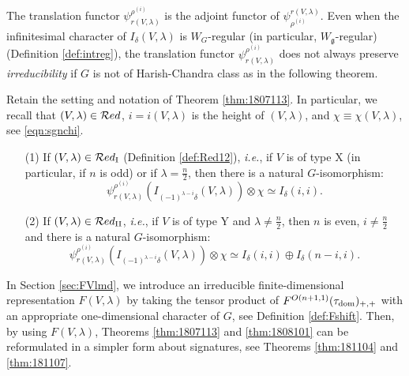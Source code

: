 The translation functor 
 $\psi_{r(V,\lambda)}^{\rho^{(i)}}$
 is the adjoint functor
 of $\psi_{\rho^{(i)}}^{r(V,\lambda)}$.  
Even when the infinitesimal character
 of $I_{\delta}(V,\lambda)$
 is $W_G$-regular
 (in particular,
 $W_{\mathfrak{g}}$-regular)
 (Definition \ref{def:intreg}), 
 the translation functor $\psi_{r(V,\lambda)}^{\rho^{(i)}}$
 does not always preserve {\it{irreducibility}}
 if $G$ is not of Harish-Chandra class as in the following theorem.  

\begin{theorem}
\label{thm:1808101}
Retain the setting and notation of Theorem \ref{thm:1807113}.  
In particular,
 we recall that 
$(V,\lambda)\in {\mathcal{R}}ed$, 
 $i=i(V,\lambda)$ is the height of $(V,\lambda)$, 
 and $\chi\equiv \chi(V,\lambda)$, 
 see \eqref{eqn:sgnchi}.  
\begin{enumerate}
\item[{\rm{(1)}}]
If 
$(V,\lambda)\in {\mathcal{R}}ed_{\operatorname{I}}$
 (Definition \ref{def:Red12}), 
 {\it{i.e.}}, 
 if $V$ is of type X
 (in particular, 
 if $n$ is odd)
 or if $\lambda=\frac n 2$, 
 then there is a natural $G$-isomorphism:
\[
  \psi_{r(V,\lambda)}^{\rho^{(i)}}(I_{(-1)^{\lambda-i}\delta}(V,\lambda))
  \otimes \chi
  \simeq 
  I_{\delta}(i,i).  
\]
\item[{\rm{(2)}}]
If 
$(V,\lambda)\in {\mathcal{R}}ed_{\operatorname{I I}}$, 
 {\it{i.e.}}, 
 if $V$ is of type Y 
 and $\lambda \ne \frac n 2$, 
 then $n$ is even, 
 $i \ne \frac n 2$
 and there is a natural $G$-isomorphism:
\[
  \psi_{r(V,\lambda)}^{\rho^{(i)}}(I_{(-1)^{\lambda-i}\delta}(V,\lambda))
  \otimes \chi
  \simeq 
  I_{\delta}(i,i) \oplus I_{\delta}(n-i,i).  
\]
\end{enumerate}
\end{theorem}
In Section \ref{sec:FVlmd}, 
 we introduce an irreducible finite-dimensional representation
 $F(V,\lambda)$
 by taking the tensor product
 of $F^{{O(n+1,1)}}({\tau_{\operatorname{dom}}})_{+,+}$
 with an appropriate one-dimensional character of $G$, 
 see Definition \ref{def:Fshift}.  
Then, 
 by using $F(V,\lambda)$, 
 Theorems \ref{thm:1807113} and \ref{thm:1808101}
 can be reformulated in a simpler form about signatures, 
 see Theorems \ref{thm:181104} and \ref{thm:181107}.  



